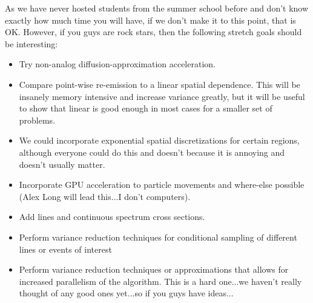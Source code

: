 \documentclass{article}
\begin{document}
As we have never hosted students from the summer school before and don't know
exactly how much time you will have, if we don't make
it to this point, that is OK.  However, if you guys are rock stars, then the
following stretch goals should be interesting:

\begin{itemize}

\item Try non-analog diffusion-approximation acceleration.
\item Compare point-wise re-emission to a linear spatial dependence.  This will
be insanely memory intensive and increase variance greatly, but it will be useful to show that linear is
good enough in most cases for a smaller set of problems.  
\item We could incorporate exponential spatial discretizations for certain
regions, although everyone could do this and doesn't because it is annoying and
doesn't usually matter.
\item Incorporate GPU acceleration to particle movements and where-else possible
(Alex Long will lead this...I don't computers).
\item Add lines and continuous spectrum cross sections.
\item Perform variance reduction techniques for conditional sampling of
different lines or events of interest
\item Perform variance reduction techniques or approximations that allows for increased
parallelism of the algorithm.  This is a hard one...we haven't really thought of
any good ones yet...so if you guys have ideas...

\end{itemize}





\end{document}
